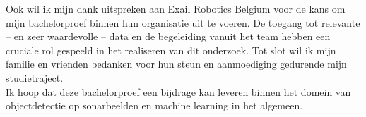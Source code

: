 Ook wil ik mijn dank uitspreken aan Exail Robotics Belgium voor de kans om mijn bachelorproef binnen hun organisatie uit te voeren. De toegang tot relevante -- en zeer waardevolle -- data en de begeleiding vanuit het team hebben een cruciale rol gespeeld in het realiseren van dit onderzoek. Tot slot wil ik mijn familie en vrienden bedanken voor hun steun en aanmoediging gedurende mijn studietraject. \\

Ik hoop dat deze bachelorproef een bijdrage kan leveren binnen het domein van objectdetectie op sonarbeelden en machine learning in het algemeen.